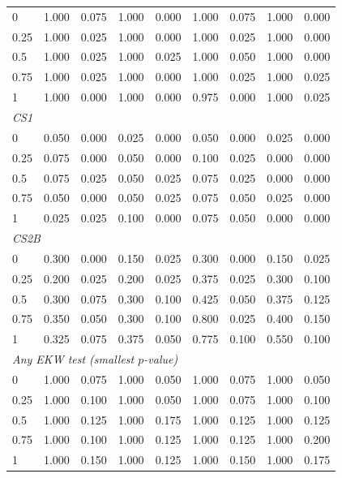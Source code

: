 \begin{table}[htbp]
\begin{tabular}{lcccccccc}
0 & 1.000 & 0.075 & 1.000 & 0.000 & 1.000 & 0.075 & 1.000 & 0.000 \\
0.25 & 1.000 & 0.025 & 1.000 & 0.000 & 1.000 & 0.025 & 1.000 & 0.000 \\
0.5 & 1.000 & 0.025 & 1.000 & 0.025 & 1.000 & 0.050 & 1.000 & 0.000 \\
0.75 & 1.000 & 0.025 & 1.000 & 0.000 & 1.000 & 0.025 & 1.000 & 0.025 \\
1 & 1.000 & 0.000 & 1.000 & 0.000 & 0.975 & 0.000 & 1.000 & 0.025 \\
\midrule
\multicolumn{9}{l}{\textit{CS1}} \\
0 & 0.050 & 0.000 & 0.025 & 0.000 & 0.050 & 0.000 & 0.025 & 0.000 \\
0.25 & 0.075 & 0.000 & 0.050 & 0.000 & 0.100 & 0.025 & 0.000 & 0.000 \\
0.5 & 0.075 & 0.025 & 0.050 & 0.025 & 0.075 & 0.025 & 0.000 & 0.000 \\
0.75 & 0.050 & 0.000 & 0.050 & 0.025 & 0.075 & 0.050 & 0.025 & 0.000 \\
1 & 0.025 & 0.025 & 0.100 & 0.000 & 0.075 & 0.050 & 0.000 & 0.000 \\
\midrule
\multicolumn{9}{l}{\textit{CS2B}} \\
0 & 0.300 & 0.000 & 0.150 & 0.025 & 0.300 & 0.000 & 0.150 & 0.025 \\
0.25 & 0.200 & 0.025 & 0.200 & 0.025 & 0.375 & 0.025 & 0.300 & 0.100 \\
0.5 & 0.300 & 0.075 & 0.300 & 0.100 & 0.425 & 0.050 & 0.375 & 0.125 \\
0.75 & 0.350 & 0.050 & 0.300 & 0.100 & 0.800 & 0.025 & 0.400 & 0.150 \\
1 & 0.325 & 0.075 & 0.375 & 0.050 & 0.775 & 0.100 & 0.550 & 0.100 \\
\midrule
\multicolumn{9}{l}{\textit{Any EKW test (smallest $p$-value)}} \\
0 & 1.000 & 0.075 & 1.000 & 0.050 & 1.000 & 0.075 & 1.000 & 0.050 \\
0.25 & 1.000 & 0.100 & 1.000 & 0.050 & 1.000 & 0.075 & 1.000 & 0.100 \\
0.5 & 1.000 & 0.125 & 1.000 & 0.175 & 1.000 & 0.125 & 1.000 & 0.125 \\
0.75 & 1.000 & 0.100 & 1.000 & 0.125 & 1.000 & 0.125 & 1.000 & 0.200 \\
1 & 1.000 & 0.150 & 1.000 & 0.125 & 1.000 & 0.150 & 1.000 & 0.175 \\
\bottomrule
\end{tabular}
\par\smallskip

\end{table}
